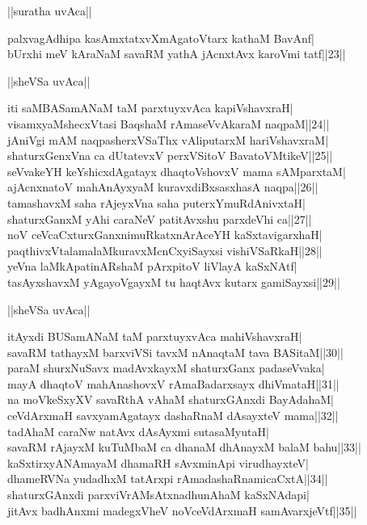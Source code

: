 \documentclass{article}
\begin{document}
\begin{center}
||suratha uvAca||
\end{center}

palxvagAdhipa kasAmxtatxvXmAgatoVtarx kathaM BavAnf|\\
bUrxhi meV kAraNaM savaRM yathA jAcnxtAvx karoVmi tatf||23||\\

\begin{center}
||sheVSa uvAca||
\end{center}

iti saMBASamANaM taM parxtuyxvAca kapiVshavxraH|\\
visamxyaMshecxVtasi BaqshaM rAmaseVvAkaraM naqpaM||24||\\
jAniVgi mAM naqpasherxVSaThx vAliputarxM hariVshavxraM|\\
shaturxGenxVna ca dUtatevxV perxVSitoV BavatoVMtikeV||25||\\
seVvakeYH keYshicxdAgatayx dhaqtoVshovxV mama sAMparxtaM|\\
ajAcnxnatoV mahAnAyxyaM kuravxdiBxsasxhasA naqpa||26||\\
tamashavxM saha rAjeyxVna saha puterxYmuRdAnivxtaH|\\
shaturxGanxM yAhi caraNeV patitAvxshu parxdeVhi ca||27||\\
noV ceVcaCxturxGanxnimuRkatxnArAceYH kaSxtavigarxhaH|\\
paqthivxVtalamalaMkuravxMcnCxyiSayxsi vishiVSaRkaH||28||\\
yeVna laMkApatinARshaM pArxpitoV liVlayA kaSxNAtf|\\
tasAyxshavxM yAgayoVgayxM tu haqtAvx kutarx gamiSayxsi||29||\\

\begin{center}
||sheVSa uvAca||
\end{center}

itAyxdi BUSamANaM taM parxtuyxvAca mahiVshavxraH|\\
savaRM tathayxM barxviVSi tavxM nAnaqtaM tava BASitaM||30||\\
paraM shurxNuSavx madAvxkayxM shaturxGanx padaseVvaka|\\
mayA dhaqtoV mahAnashovxV rAmaBadarxsayx dhiVmataH||31||\\
na moVkeSxyXV savaRthA vAhaM shaturxGAnxdi BayAdahaM|\\
ceVdArxmaH savxyamAgatayx dashaRnaM dAsayxteV mama||32||\\
tadAhaM caraNw natAvx dAsAyxmi sutasaMyutaH|\\
savaRM rAjayxM kuTuMbaM ca dhanaM dhAnayxM balaM bahu||33||\\
kaSxtirxyANAmayaM dhamaRH sAvxminApi virudhayxteV|\\
dhameRVNa yudadhxM tatArxpi rAmadashaRnamicaCxtA||34||\\
shaturxGAnxdi parxviVrAMsAtxnadhunAhaM kaSxNAdapi|\\
jitAvx badhAnxmi madegxVheV noVceVdArxmaH samAvarxjeVtf||35||\\
\end{document}
